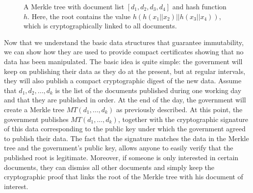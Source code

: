 \begin{figure}
\caption{A Merkle tree with document list $[d_1,d_2,d_3,d_4]$ and hash function $h$. Here, the root contains the value $h(h(x_1||x_2)||h(x_3||x_4))$, which is cryptographically linked to all documents.}%
\label{merkle_fig}
\end{figure}

\medskip
{} Now that we understand the basic data structures that guarantee immutability, we can show how they are used to provide compact certificates showing that no data has been manipulated. The basic idea is quite simple: the government will keep on publishing their data as they do at the present, but at regular intervals, they will also publish a compact cryptographic digest of the new data. Assume that $d_1,d_2,\ldots ,d_k$ is the list of the documents published during one working day and that they are published in order. At the end of the day, the government will create a Merkle tree $MT(d_1,\ldots ,d_k)$ as previously described. At this point, the government publishes $MT(d_1,\ldots ,d_k)$, together with the cryptographic signature of this data corresponding to the public key under which the government agreed to publish their data. The fact that the signature matches the data in the Merkle tree and the government's public key, allows anyone to easily verify that the published root is legitimate. Moreover, if someone is only interested in certain documents, they can dismiss all other documents and simply keep the cryptographic proof that links the root of the Merkle tree with his document of interest.

